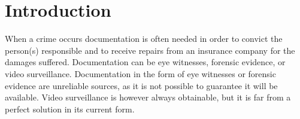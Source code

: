 \chapter{Introduction}


When a crime occurs documentation is often needed in order to convict the person(s) responsible and to receive repairs from an insurance company for the damages suffered.
Documentation can be eye witnesses, forensic evidence, or video surveillance.
Documentation in the form of eye witnesses or forensic evidence are unreliable sources, as it is not possible to guarantee it will be available.
Video surveillance is however always obtainable, but it is far from a perfect solution in its current form.





